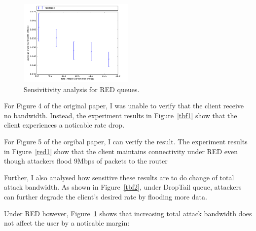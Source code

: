 \documentclass[12pt,twocolumn]{article}
\begin{document}
\begin{figure}[h!]
    \centering
    \includegraphics[width=0.5\textwidth]{../Results/result-red.png} \caption{Sensivitivity analysis for RED queues.} \label{red2}
\end{figure}

For Figure 4 of the original paper, I was unable to verify that the client receive no bandwidth.
Instead, the experiment results in Figure~\ref{tbf1} show that the client experiences a noticable rate drop.

For Figure 5 of the orgibal paper, I can verify the result.
The experiment results in Figure~\ref{red1} show that the client maintains connectivity under RED even though attackers flood 9Mbps of packets to the router

Further, I also analysed how sensitive these results are to do change of total attack bandwidth.
As shown in Figure~\ref{tbf2}, under DropTail queue, attackers can further degrade the client's desired rate by flooding more data.

Under RED however, Figure~\ref{red2} shows that increasing total attack bandwidth does not affect the user by a noticable margin:



\end{document}
